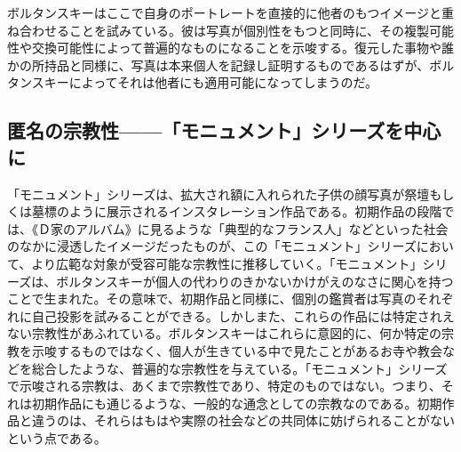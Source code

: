 \documentclass[b5j,twoside,twocolumn]{utarticle}
\begin{document}
ボルタンスキーはここで自身のポートレートを直接的に他者のもつイメージと重ね合わせることを試みている。彼は写真が個別性をもつと同時に、その複製可能性や交換可能性によって普遍的なものになることを示唆する。復元した事物や誰かの所持品と同様に、写真は本来個人を記録し証明するものであるはずが、ボルタンスキーによってそれは他者にも適用可能になってしまうのだ。
\subsection{\tbaselineshift =3.0pt 匿名の宗教性------「モニュメント」シリーズを中心に}
「モニュメント」シリーズは、拡大され額に入れられた子供の顔写真が祭壇もしくは墓標のように展示されるインスタレーション作品である。初期作品の段階では、《Ｄ家のアルバム》に見るような「典型的なフランス人」などといった社会のなかに浸透したイメージだったものが、この「モニュメント」シリーズにおいて、より広範な対象が受容可能な宗教性に推移していく。「モニュメント」シリーズは、ボルタンスキーが個人の代わりのきかないかけがえのなさに関心を持つことで生まれた。その意味で、初期作品と同様に、個別の鑑賞者は写真のそれぞれに自己投影を試みることができる。しかしまた、これらの作品には特定されえない宗教性があふれている。ボルタンスキーはこれらに意図的に、何か特定の宗教を示唆するものではなく、個人が生きている中で見たことがあるお寺や教会などを総合したような、普遍的な宗教性を与えている。「モニュメント」シリーズで示唆される宗教は、あくまで宗教性であり、特定のものではない。つまり、それは初期作品にも通じるような、一般的な通念としての宗教なのである。初期作品と違うのは、それらはもはや実際の社会などの共同体に妨げられることがないという点である。
\end{document}
